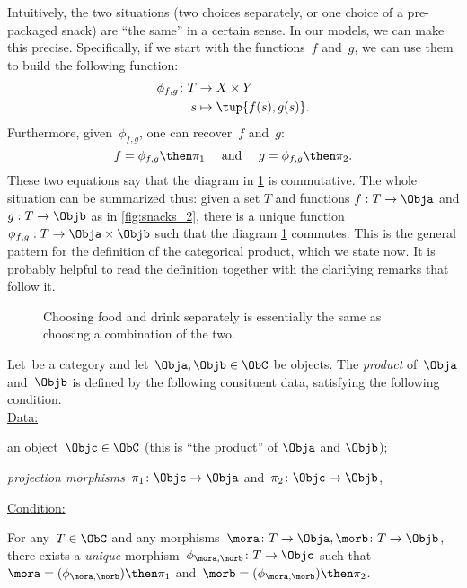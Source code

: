 Intuitively, the two situations (two choices separately, or one choice of a pre-packaged snack) are ``the same'' in a certain sense. In our models, we can make this precise. Specifically, if we start with the functions~$f$ and~$g$, we can use them to build the following function:
\begin{equation*}
    \begin{aligned}
    \phi_{f,g}\colon T&\to X\times Y\\
    s&\mapsto \tup{f(s),g(s)}.
    \end{aligned}
\end{equation*}
Furthermore, given~$\phi_{f,g}$, one can recover~$f$ and~$g$:
\begin{equation*}
    f=\phi_{f,g}\then \pi_1 \quad  \text{ and } \quad g=\phi_{f,g}\then \pi_2.
\end{equation*}
These two equations say that the diagram in \cref{fig:snacks_3} is commutative. The whole situation can be summarized thus: given a set $T$ and functions $f: T \rightarrow \Obja$ and $g: T \rightarrow \Objb$ as in \cref{fig:snacks_2}, there is a unique function $\phi_{f,g} : T \rightarrow \Obja \times \Objb$ such that the diagram \cref{fig:snacks_3} commutes. This is the general pattern for the definition of the categorical product, which we state now. It is probably helpful to read the definition together with the clarifying remarks that follow it.



\begin{figure}[h!]
\begin{center}
\end{center}
\caption{Choosing food and drink separately is essentially the same as choosing a combination of the two. \label{fig:snacks_3}}
\end{figure}






\begin{ctdefinition}
Let~\CatC be a category and let~$\Obja, \Objb \in \ObC$ be objects. The \emph{product} of~$\Obja$ and~$\Objb$ is defined by the following consituent data, satisfying the following condition. \\
\underline{Data:}
\begin{compactenum}
    \item an object~$\Objc \in \ObC$ (this is ``the product'' of $\Obja$  and $\Objb$);
    \item \emph{projection morphisms}~$\pi_1 \colon \Objc \to \Obja$ and~$\pi_2 \colon \Objc \to \Objb$,
\end{compactenum}
\underline{Condition:}
\begin{compactenum}
    \item For any~$T \in \ObC$ and any morphisms~$\mora \colon T \to \Obja, \morb \colon T \to \Objb$, there exists a \emph{unique} morphism~$\phi_{\mora,\morb} \colon T \to \Objc$ such that~$\mora = (\phi_{\mora,
\morb})\then \pi_1$ and~$\morb=(\phi_{\mora, \morb})\then \pi_2$.
\end{compactenum}
\end{ctdefinition}

